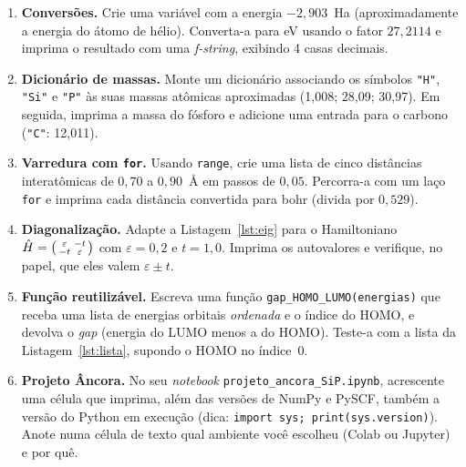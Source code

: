\documentclass[11pt,a4paper,openany]{book}
\newcommand{\code}[1]{\texttt{#1}}
\newcommand{\pyscf}{\textsf{PySCF}}
\newcommand{\numpy}{\textsf{NumPy}}
\newcommand{\python}{\textsf{Python}}
\begin{document}
\begin{enumerate}[leftmargin=*,label=\textbf{1.\arabic*}]
  \item \textbf{Conversões.} Crie uma variável com a energia
        $-2{,}903$~Ha (aproximadamente a energia do átomo de hélio). Converta-a
        para eV usando o fator $27{,}2114$ e imprima o resultado com uma
        \emph{f-string}, exibindo 4 casas decimais.

  \item \textbf{Dicionário de massas.} Monte um dicionário associando os símbolos
        \code{"H"}, \code{"Si"} e \code{"P"} às suas massas atômicas aproximadas
        (1{,}008; 28{,}09; 30{,}97). Em seguida, imprima a massa do fósforo e
        adicione uma entrada para o carbono (\code{"C"}: 12{,}011).

  \item \textbf{Varredura com \code{for}.} Usando \code{range}, crie uma lista de
        cinco distâncias interatômicas de $0{,}70$ a $0{,}90$~Å em passos de
        $0{,}05$. Percorra-a com um laço \code{for} e imprima cada distância
        convertida para bohr (divida por $0{,}529$).

  \item \textbf{Diagonalização.} Adapte a Listagem~\ref{lst:eig} para o
        Hamiltoniano
        $\hat H = \begin{psmallmatrix} \varepsilon & -t \\ -t & \varepsilon
        \end{psmallmatrix}$ com $\varepsilon = 0{,}2$ e $t = 1{,}0$. Imprima os
        autovalores e verifique, no papel, que eles valem $\varepsilon \pm t$.

  \item \textbf{Função reutilizável.} Escreva uma função
        \code{gap\_HOMO\_LUMO(energias)} que receba uma lista de energias orbitais
        \emph{ordenada} e o índice do HOMO, e devolva o \emph{gap}
        (energia do LUMO menos a do HOMO). Teste-a com a lista da
        Listagem~\ref{lst:lista}, supondo o HOMO no índice~0.

  \item \textbf{Projeto Âncora.} No seu \emph{notebook}
        \code{projeto\_ancora\_SiP.ipynb}, acrescente uma célula que imprima, além
        das versões de \numpy{} e \pyscf{}, também a versão do \python{} em
        execução (dica: \code{import sys; print(sys.version)}). Anote numa célula de
        texto qual ambiente você escolheu (Colab ou Jupyter) e por quê.
\end{enumerate}
\end{document}
